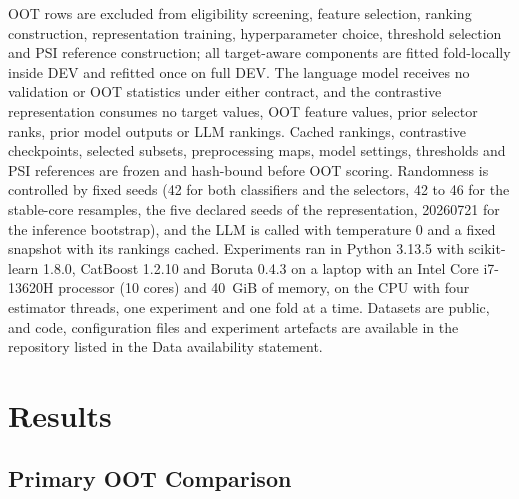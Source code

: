 \documentclass[final,5p,twocolumn]{elsarticle}
\begin{document}
OOT rows are excluded from eligibility screening, feature selection, ranking construction, representation training, hyperparameter choice, threshold selection and PSI reference construction; all target-aware components are fitted fold-locally inside DEV and refitted once on full DEV. The language model receives no validation or OOT statistics under either contract, and the contrastive representation consumes no target values, OOT feature values, prior selector ranks, prior model outputs or LLM rankings. Cached rankings, contrastive checkpoints, selected subsets, preprocessing maps, model settings, thresholds and PSI references are frozen and hash-bound before OOT scoring. Randomness is controlled by fixed seeds (42 for both classifiers and the selectors, 42 to 46 for the stable-core resamples, the five declared seeds of the representation, 20260721 for the inference bootstrap), and the LLM is called with temperature 0 and a fixed snapshot with its rankings cached. Experiments ran in Python 3.13.5 with scikit-learn 1.8.0, CatBoost 1.2.10 and Boruta 0.4.3 on a laptop with an Intel Core i7-13620H processor (10 cores) and 40~GiB of memory, on the CPU with four estimator threads, one experiment and one fold at a time. Datasets are public, and code, configuration files and experiment artefacts are available in the repository listed in the Data availability statement.


\section{Results}
\label{sec:results}

\subsection{Primary OOT Comparison}
\label{subsec:primary_results}
\end{document}
